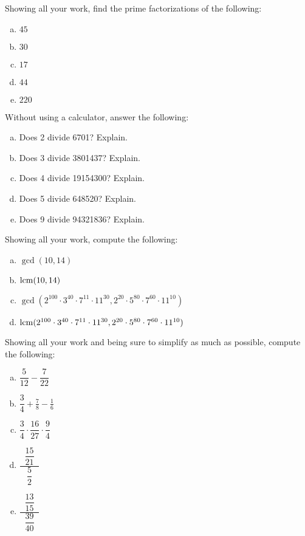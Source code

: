 \documentclass[11pt,letterpaper]{article}
\begin{document}

 Showing all your work, find the prime factorizations of the following:
	\begin{enumerate}[(a)]
	\item $45$
	\item $30$
	\item $17$
	\item $44$
	\item $220$
	\end{enumerate}



\newpage



 Without using a calculator, answer the following:
	\begin{enumerate}[(a)]
	\item Does 2 divide 6701? Explain.
	\item Does 3 divide 3801437? Explain.
	\item Does 4 divide 19154300? Explain.
	\item Does 5 divide 648520? Explain.
	\item Does 9 divide 94321836? Explain. 
	\end{enumerate}



\newpage



 Showing all your work, compute the following:
	\begin{enumerate}[(a)]
	\item $\gcd(10, 14)$
	\item $\operatorname{lcm}(10, 14)$
	\item $\gcd(2^{100} \cdot 3^{40} \cdot 7^{11} \cdot 11^{30}, 2^{20} \cdot 5^{80} \cdot 7^{60} \cdot 11^{10})$
	\item $\operatorname{lcm}(2^{100} \cdot 3^{40} \cdot 7^{11} \cdot 11^{30}, 2^{20} \cdot 5^{80} \cdot 7^{60} \cdot 11^{10})$
	\end{enumerate}



\newpage



 Showing all your work and being sure to simplify as much as possible, compute the following:
	\begin{enumerate}[(a)]
	\item $\dfrac{5}{12} - \dfrac{7}{22}$
	\item $\dfrac{3}{4} + \frac{7}{8} - \frac{1}{6}$
	\item $\dfrac{3}{4} \cdot \dfrac{16}{27} \cdot \dfrac{9}{4}$
	\item $\dfrac{\;\;\dfrac{15}{21}\;\;}{\;\;\dfrac{5}{2}\;\;}$
	\item $\dfrac{\;\;\dfrac{13}{15}\;\;}{\;\;\dfrac{39}{40}\;\;}$
	\end{enumerate}
\end{document}
